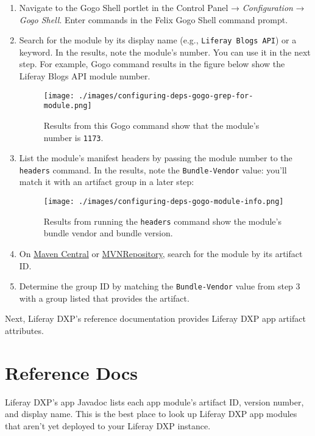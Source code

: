 \begin{enumerate}
\def\labelenumi{\arabic{enumi}.}
\item
  Navigate to the Gogo Shell portlet in the Control Panel →
  \emph{Configuration} → \emph{Gogo Shell}. Enter commands in the Felix
  Gogo Shell command prompt.
\item
  Search for the module by its display name (e.g.,
  \texttt{Liferay\ Blogs\ API}) or a keyword. In the results, note the
  module's number. You can use it in the next step. For example, Gogo
  command results in the figure below show the Liferay Blogs API module
  number.

  \begin{figure}
  \centering
  \texttt{[image: ./images/configuring-deps-gogo-grep-for-module.png]}
  \caption{Results from this Gogo command show that the module's number
  is \texttt{1173}.}
  \end{figure}
\item
  List the module's manifest headers by passing the module number to the
  \texttt{headers} command. In the results, note the
  \texttt{Bundle-Vendor} value: you'll match it with an artifact group
  in a later step:

  \begin{figure}
  \centering
  \texttt{[image: ./images/configuring-deps-gogo-module-info.png]}
  \caption{Results from running the \texttt{headers} command show the
  module's bundle vendor and bundle version.}
  \end{figure}
\item
  On \href{https://search.maven.org/}{Maven Central} or
  \href{https://mvnrepository.com}{MVNRepository}, search for the module
  by its artifact ID.
\item
  Determine the group ID by matching the \texttt{Bundle-Vendor} value
  from step 3 with a group listed that provides the artifact.
\end{enumerate}

Next, Liferay DXP's reference documentation provides Liferay DXP app
artifact attributes.

\section{Reference Docs}\label{reference-docs}

Liferay DXP's app Javadoc lists each app module's artifact ID, version
number, and display name. This is the best place to look up Liferay DXP
app modules that aren't yet deployed to your Liferay DXP instance.

